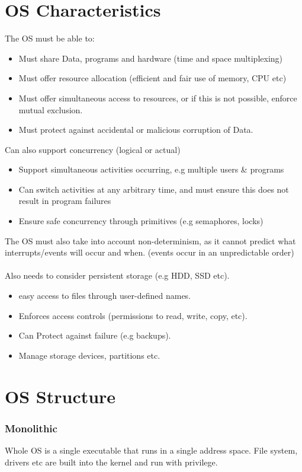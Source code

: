\documentclass{report}
\begin{document}
    \section*{OS Characteristics}
        The OS must be able to:
        \begin{itemize}
            \item Must share Data, programs and hardware (time and space multiplexing)
            \item Must offer resource allocation (efficient and fair use of memory, CPU etc)
            \item Must offer simultaneous access to resources, or if this is not possible, enforce mutual exclusion.
            \item Must protect against accidental or malicious corruption of Data.
        \end{itemize}
        Can also support concurrency (logical or actual)
        \begin{itemize}
            \item Support simultaneous activities occurring, e.g multiple users \& programs 
            \item Can switch activities at any arbitrary time, and must ensure this does not result in program failures
            \item Ensure safe concurrency through primitives (e.g semaphores, locks)
        \end{itemize}
        The OS must also take into account non-determinism, as it cannot predict what interrupts/events will occur and when. (events occur in an unpredictable order)
        \\
        \\ Also needs to consider persistent storage (e.g HDD, SSD etc).
        \begin{itemize}
            \item easy access to files through user-defined names.
            \item Enforces access controls (permissions to read, write, copy, etc).
            \item Can Protect against failure (e.g backups).
            \item Manage storage devices, partitions etc.
        \end{itemize}
    \section*{OS Structure}
        \subsubsection*{Monolithic}
            Whole OS is a single executable that runs in a single address space. File system, drivers etc are built into the kernel and run with privilege.
\end{document}
